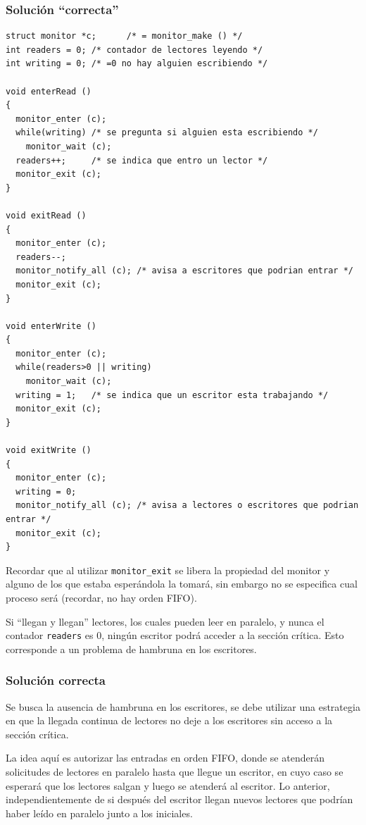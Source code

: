\subsubsection{Solución ``correcta''}
\begin{lstlisting}
struct monitor *c;      /* = monitor_make () */
int readers = 0; /* contador de lectores leyendo */
int writing = 0; /* =0 no hay alguien escribiendo */

void enterRead ()
{
  monitor_enter (c);
  while(writing) /* se pregunta si alguien esta escribiendo */
    monitor_wait (c);
  readers++;     /* se indica que entro un lector */
  monitor_exit (c);
}

void exitRead ()
{
  monitor_enter (c);
  readers--;
  monitor_notify_all (c); /* avisa a escritores que podrian entrar */
  monitor_exit (c);
}

void enterWrite ()
{
  monitor_enter (c);
  while(readers>0 || writing)
    monitor_wait (c);
  writing = 1;   /* se indica que un escritor esta trabajando */
  monitor_exit (c);
}

void exitWrite ()
{
  monitor_enter (c);
  writing = 0;
  monitor_notify_all (c); /* avisa a lectores o escritores que podrian entrar */
  monitor_exit (c);
}
\end{lstlisting}

Recordar que al utilizar \texttt{monitor\_exit} se libera la propiedad del
monitor y alguno de los que estaba esperándola la tomará, sin embargo no se
especifica cual proceso será (recordar, no hay orden FIFO).

Si ``llegan y llegan'' lectores, los cuales pueden leer en paralelo, y nunca el
contador \texttt{readers} es 0, ningún escritor podrá acceder a la sección
crítica. Esto corresponde a un problema de hambruna en los escritores.

\subsubsection{Solución correcta}
Se busca la ausencia de hambruna en los escritores, se debe utilizar una
estrategia en que la llegada continua de lectores no deje a los escritores sin
acceso a la sección crítica.

La idea aquí es autorizar las entradas en orden FIFO, donde se atenderán
solicitudes de lectores en paralelo hasta que llegue un escritor, en cuyo caso
se esperará que los lectores salgan y luego se atenderá al escritor.
Lo anterior, independientemente de si después del escritor llegan nuevos
lectores que podrían haber leído en paralelo junto a los iniciales.


